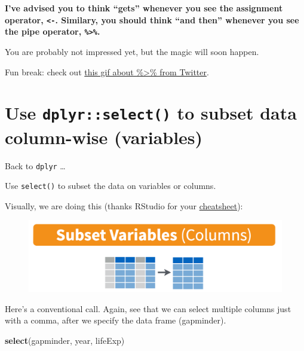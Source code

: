 \documentclass[]{book}
\newenvironment{Shaded}{\begin{snugshade}}{\end{snugshade}}
\newcommand{\KeywordTok}[1]{\textcolor[rgb]{0.13,0.29,0.53}{\textbf{{#1}}}}
\newcommand{\DecValTok}[1]{\textcolor[rgb]{0.00,0.00,0.81}{{#1}}}
\newcommand{\StringTok}[1]{\textcolor[rgb]{0.31,0.60,0.02}{{#1}}}
\newcommand{\NormalTok}[1]{{#1}}
\theoremstyle{definition}
\theoremstyle{definition}
\theoremstyle{definition}
\theoremstyle{remark}
\begin{document}
\begin{Shaded}
\end{Shaded}

\textbf{I've advised you to think ``gets'' whenever you see the
assignment operator, \texttt{\textless{}-}. Similary, you should think
``and then'' whenever you see the pipe operator,
\texttt{\%\textgreater{}\%}.}

You are probably not impressed yet, but the magic will soon happen.

Fun break: check out
\href{https://twitter.com/backerman150/status/926479565869993984}{this
gif about \%\textgreater{}\% from Twitter}.

\section{\texorpdfstring{Use \texttt{dplyr::select()} to subset data
column-wise
(variables)}{Use dplyr::select() to subset data column-wise (variables)}}\label{use-dplyrselect-to-subset-data-column-wise-variables}

Back to \texttt{dplyr} \ldots{}

Use \texttt{select()} to subset the data on variables or columns.

Visually, we are doing this (thanks RStudio for your
\href{http://www.rstudio.com/wp-content/uploads/2015/02/data-wrangling-cheatsheet.pdf}{cheatsheet}):

\begin{figure}[htbp]
\centering
\includegraphics{img/rstudio-cheatsheet-select.png}
\caption{}
\end{figure}

Here's a conventional call. Again, see that we can select multiple
columns just with a comma, after we specify the data frame (gapminder).

\begin{Shaded}
\begin{Highlighting}[]
\KeywordTok{select}\NormalTok{(gapminder, year, lifeExp) }
\end{Highlighting}
\end{Shaded}
\end{document}

